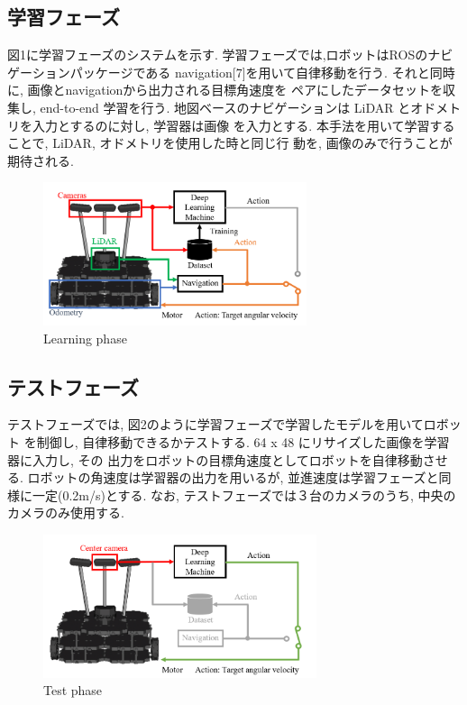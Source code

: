 \documentclass{jarticle}
\begin{document}
\subsection{学習フェーズ}
図1に学習フェーズのシステムを示す. 学習フェーズでは,ロボットはROSのナビゲーションパッケージである
navigation[7]を用いて自律移動を行う. それと同時に, 画像とnavigationから出力される目標角速度を
ペアにしたデータセットを収集し, end-to-end 学習を行う.
地図ベースのナビゲーションは LiDAR とオドメトリを入力とするのに対し, 学習器は画像
を入力とする. 本手法を用いて学習することで, LiDAR, オドメトリを使用した時と同じ行
動を, 画像のみで行うことが期待される. 


\begin{figure}[h!]
  \centering
   \includegraphics[height=42mm]{./figs/ga.png}
   \caption{Learning phase}
\end{figure}


\subsection{テストフェーズ}
テストフェーズでは, 図2のように学習フェーズで学習したモデルを用いてロボット
を制御し, 自律移動できるかテストする. 64 x 48 にリサイズした画像を学習器に入力し, その
出力をロボットの目標角速度としてロボットを自律移動させる.
ロボットの角速度は学習器の出力を用いるが, 並進速度は学習フェーズと同様に一定(0.2m/s)とする.
なお, テストフェーズでは３台のカメラのうち, 中央のカメラのみ使用する.

\begin{figure}[h!]
  \centering
   \includegraphics[height=42mm]{./figs/te.png}
   \caption{Test phase}
\end{figure}
\end{document}
